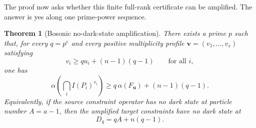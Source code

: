\documentclass[11pt]{article}
\newtheorem{theorem}{Theorem}[section]
\theoremstyle{remark}
\begin{document}
The proof now asks whether this finite full-rank certificate can be amplified.  The answer is yes along one prime-power sequence.

\begin{theorem}[Bosonic no-dark-state amplification]
\label{thm:amplification}
There exists a prime $p$ such that, for every $q=p^e$ and every positive multiplicity profile $\mathbf v=(v_1,\ldots,v_s)$ satisfying
\[
  v_i\ge q u_i+(n-1)(q-1)
  \qquad\text{for all }i,
\]
one has
\begin{equation}
  \alpha\!\left(\bigcap_iI(P_i)^{v_i}\right)
  \ge q\,\alpha(F_{\mathbf u})+(n-1)(q-1).
  \label{eq:amplification}
\end{equation}
Equivalently, if the source constraint operator has no dark state at particle number $A=a-1$, then the amplified target constraints have no dark state at
\[
  D_q=qA+n(q-1).
\]
\end{theorem}
\end{document}
